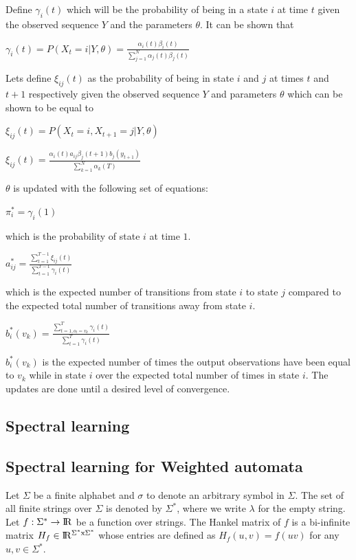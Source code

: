 \documentclass[letterpaper]{article}
\begin{document}
Define $\gamma_{i}(t)$ which will be the probability of being in a state $i$ at time $t$ given the observed sequence $Y$ and the parameters $\theta$. It can be shown that
\begin{center}
$
\gamma_{i}(t)=P(X_{t}=i|Y,\theta) = \frac{\alpha_{i}(t)\beta_{i}(t)}{\sum_{j=1}^N \alpha_{j}(t)\beta_{j}(t)}
$
\end{center}
Lets define $\xi_{ij}(t)$ as the probability of being in state $i$ and $j$ at times $t$ and $t+1$ respectively given the observed sequence $Y$ and parameters $\theta$ which can be shown to be equal to

\begin{center}

$\xi_{ij}(t)=P(X_{t}=i,X_{t+1}=j|Y,\theta)$

$\xi_{ij}(t)=\frac{\alpha_{i}(t) a_{ij} \beta_{j}(t+1) b_{j}(y_{t+1})}{\sum_{k=1}^N \alpha_k(T)}$
\end{center}

$\theta$ is updated with the following set of equations:

\begin{center}
$\pi_{i}^* = \gamma_{i}(1)$
\end{center}

which is the probability of state $i$ at time $1$.

\begin{center}
$a_{ij}^*=\frac{\sum^{T-1}_{t=1}\xi_{ij}(t)}{\sum^{T-1}_{t=1}\gamma_{i}(t)}$
\end{center}

which is the expected number of transitions from state $i$ to state $j$ compared to the expected total number of transitions away from state $i$.

\begin{center}
$b_{i}^*(v_{k})=\frac{\sum^T_{t=1,o_{t}=v_{k}} \gamma_{i}(t)}{\sum^T_{t=1} \gamma_i(t)}$
\end{center}

$b_{i}^*(v_{k})$ is the expected number of times the output observations have been equal to $v_{k}$ while in state $i$ over the expected total number of times in state $i$. The updates are done until a desired level of convergence.

\subsection{Spectral learning}

\subsection{Spectral learning for Weighted automata}
Let $\Sigma$ be a finite alphabet and $\sigma$ to denote an arbitrary symbol in $\Sigma$. The set of all finite strings over $\Sigma$ is denoted by $\Sigma^{*}$, where we write $\lambda$ for the empty string. Let $f:\Sigma^{*} \rightarrow \rm I\!R$ be a function over strings. The Hankel matrix of $f$ is a bi-infinite matrix $H_{f} \in \rm I\!R^{\Sigma^{*}x\Sigma^{*}}$ whose entries are defined as $H_{f}(u,v) = f(uv)$ for any $u, v \in \Sigma^{*}$. 
\end{document}
